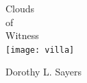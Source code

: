 \documentclass[
a5paper,
BCOR=7mm,
twoside,
DIV=calc,
12pt,
usegeometry,
chapterprefix,
headings=big]{scrbook} %
\newcommand{\moderatelyhuge}{\fontsize{40}{50}\selectfont}
\newcommand{\reasonablyhuge}{\fontsize{30}{40}\selectfont}
\newcommand{\HUGE}{\fontsize{50}{60}\selectfont}
\newcommand{\HUGE}{\fontsize{60}{70}\selectfont}
\begin{document}
\setlength{\epigraphwidth}{0.8\textwidth}
\renewcommand{\epigraphflush}{center}
\renewcommand{\sourceflush}{center}
\renewcommand*{\chaptermarkformat}{}
\renewcommand*{\chapterheadendvskip}{\vspace{10pt}}
\renewcommand*{\chapterheadstartvskip}{\vspace{0pt}}

\frontmatter
\pagestyle{empty}
\begin{titlepage}
   \recalctypearea

  \begin{center}\mytitlefont
{\HUGE Clouds}\\
\vspace{0.5cm}
{\moderatelyhuge of}\\
\vspace{0.2cm}
{\HUGE Witness}\\
\vspace*{.5cm}
\texttt{[image: villa]}\\
 \end{center}
 \vspace*{.1cm}
 \begin{center}\myauthorfont
{\reasonablyhuge Dorothy L. Sayers}\\
\end{center}
  \end{titlepage}


\pagestyle{plain}

\renewcommand*\raggedchapter{\centering}
\end{document}

